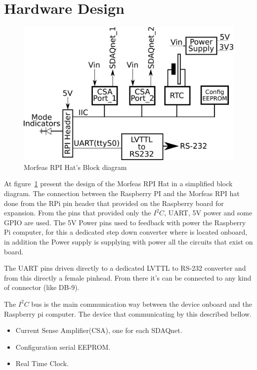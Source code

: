 \section{Hardware Design}
\begin{figure}[h]
	\centering
	\includegraphics[width=\linewidth,angle=0]{./Artwork/System.png}
	\caption{Morfeas RPI Hat's Block diagram}
	\label{fig:block}
\end{figure}

At figure~\ref{fig:block} present the design of the Morfeas RPI Hat in a simplified block diagram. The connection between the Raspberry PI and the Morfeas RPI hat done
from the RPi pin header that provided on the Raspberry board for expansion. From the pins that provided only the $I^2C$, UART, 5V power and some GPIO are used.
The 5V Power pins used to feedback with power the Raspberry Pi computer, for this a dedicated step down converter where is located onboard,
in addition the Power supply is supplying with power all the circuits that exist on board.

The UART pins driven directly to a dedicated LVTTL to RS-232 converter and from this directly a female pinhead. From there it's can be connected to any kind of connector
(like DB-9).

The $I^2C$ bus is the main communication way between the device onboard and the Raspberry pi computer. The device that communicating by this described bellow.
\begin{itemize}
	\item Current Sense Amplifier(CSA), one for each SDAQnet.
	\item Configuration serial EEPROM.
	\item Real Time Clock.
\end{itemize}

